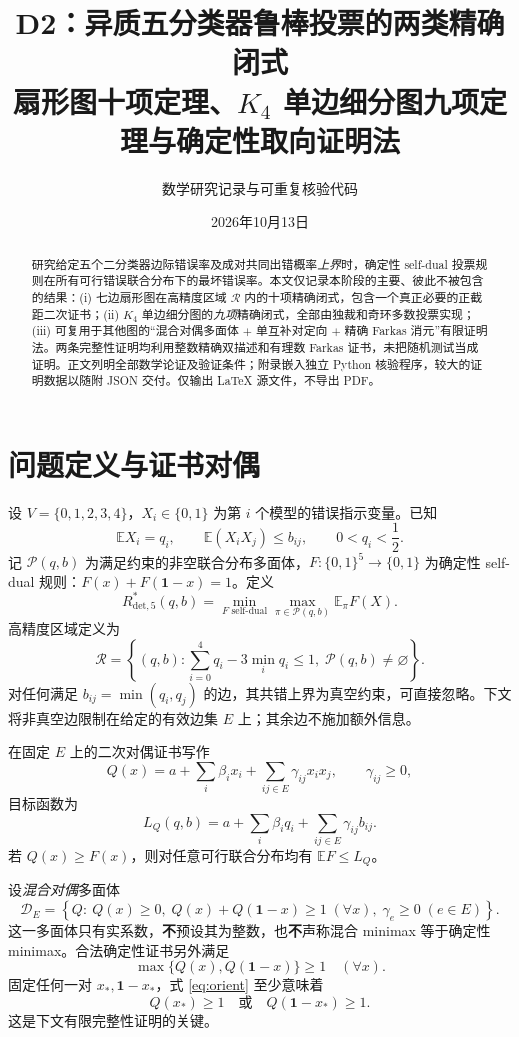 \documentclass[UTF8,11pt,a4paper]{ctexart}
\title{D2：异质五分类器鲁棒投票的两类精确闭式\\\large 扇形图十项定理、$K_4$ 单边细分图九项定理与确定性取向证明法}
\author{数学研究记录与可重复核验代码}
\date{2026年10月13日}
\newcommand{\Rd}{R_{\mathrm{det},5}^*}
\newcommand{\calP}{\mathcal{P}}
\newcommand{\calR}{\mathcal{R}}
\begin{document}
\maketitle
\begin{abstract}
研究给定五个二分类器边际错误率及成对共同出错概率\emph{上界}时，确定性 self-dual 投票规则在所有可行错误联合分布下的最坏错误率。本文仅记录本阶段的主要、彼此不被包含的结果：(i) 七边扇形图在高精度区域 $\calR$ 内的十项精确闭式，包含一个真正必要的正截距二次证书；(ii) $K_4$ 单边细分图的\emph{九项}精确闭式，全部由独裁和奇环多数投票实现；(iii) 可复用于其他图的``混合对偶多面体 $+$ 单互补对定向 $+$ 精确 Farkas 消元''有限证明法。两条完整性证明均利用整数精确双描述和有理数 Farkas 证书，未把随机测试当成证明。正文列明全部数学论证及验证条件；附录嵌入独立 Python 核验程序，较大的证明数据以随附 JSON 交付。仅输出 \LaTeX{} 源文件，不导出 PDF。
\end{abstract}
\tableofcontents

\section{问题定义与证书对偶}
设 $V=\{0,1,2,3,4\}$，$X_i\in\{0,1\}$ 为第 $i$ 个模型的错误指示变量。已知
\[
  \mathbb E X_i=q_i,\qquad
  \mathbb E(X_iX_j)\le b_{ij},
  \qquad 0<q_i<\frac12.
\]
记 $\calP(q,b)$ 为满足约束的非空联合分布多面体，$F:\{0,1\}^5\to\{0,1\}$ 为确定性 self-dual 规则：$F(x)+F(\boldsymbol1-x)=1$。定义
\[
 \Rd(q,b)=\min_{F\text{ self-dual}}\max_{\pi\in\calP(q,b)}\mathbb E_\pi F(X).
\]
高精度区域定义为
\begin{equation}\label{eq:R}
\calR=\left\{(q,b):\sum_{i=0}^4q_i-3\min_iq_i\le1,\;\calP(q,b)\ne\varnothing\right\}.
\end{equation}
对任何满足 $b_{ij}=\min(q_i,q_j)$ 的边，其共错上界为真空约束，可直接忽略。下文将非真空边限制在给定的有效边集 $E$ 上；其余边不施加额外信息。

在固定 $E$ 上的二次对偶证书写作
\begin{equation}\label{eq:Q}
 Q(x)=a+\sum_i\beta_i x_i+\sum_{ij\in E}\gamma_{ij}x_ix_j,
 \qquad \gamma_{ij}\ge0,
\end{equation}
目标函数为
\begin{equation}\label{eq:L}
 L_Q(q,b)=a+\sum_i\beta_iq_i+\sum_{ij\in E}\gamma_{ij}b_{ij}.
\end{equation}
若 $Q(x)\ge F(x)$，则对任意可行联合分布均有 $\mathbb EF\le L_Q$。

设\emph{混合对偶}多面体
\begin{equation}\label{eq:mixed}
\mathscr D_E=\left\{Q:\ Q(x)\ge0,\;Q(x)+Q(\boldsymbol1-x)\ge1\;(\forall x),\;
\gamma_e\ge0\;(e\in E)\right\}.
\end{equation}
这一多面体只有实系数，\textbf{不}预设其为整数，也\textbf{不}声称混合 minimax 等于确定性 minimax。合法确定性证书另外满足
\begin{equation}\label{eq:orient}
 \max\{Q(x),Q(\boldsymbol1-x)\}\ge1\quad(\forall x).
\end{equation}
固定任何一对 $x_*,\boldsymbol1-x_*$，式 \eqref{eq:orient} 至少意味着
\[
 Q(x_*)\ge1\quad\text{或}\quad Q(\boldsymbol1-x_*)\ge1.
\]
这是下文有限完整性证明的关键。
\end{document}
